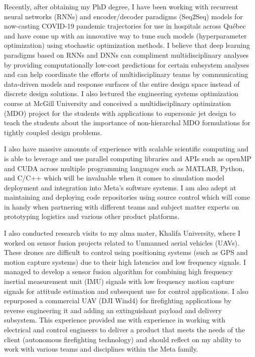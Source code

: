 \documentclass[12pt]{article} %
\begin{document}
\medskip %

Recently, after obtaining my PhD degree, I have been working with recurrent neural networks (RNNs) and encoder/decoder paradigms (Seq2Seq) models for now-casting COVID-19 pandemic trajectories for use in hospitals across Qu{\'e}bec and have come up with an innovative way to tune such models (hyperparameter optimization) using stochastic optimization methods. I believe that deep learning paradigms based on RNNs and DNNs can compliment multidisciplinary analyses by providing computationally low-cost predictions for certain subsystem analyses and can help coordinate the efforts of multidisciplinary teams by communicating data-driven models and response surfaces of the entire design space instead of discrete design solutions. I also lectured the engineering systems optimization course at McGill University and conceived a multidisciplinary optimization (MDO) project for the students with applications to supersonic jet design to teach the students about the importance of non-hierarchal MDO formulations for tightly coupled design problems.

\medskip %

I also have massive amounts of experience with scalable scientific computing and is able to leverage and use parallel computing libraries and APIs such as openMP and CUDA across multiple programming languages such as MATLAB, Python, and C/C++ which will be invaluable when it comes to simulation model deployment and integration into Meta's software systems. I am also adept at maintaining and deploying code repositories using source control which will come in handy when partnering with different teams and subject matter experts on prototyping logistics and various other product platforms.

\medskip %

I also conducted research visits to my alma mater, Khalifa University, where I worked on sensor fusion projects related to Unmanned aerial vehicles (UAVs). These drones are difficult to control using positioning systems (such as GPS and motion capture systems) due to their high latencies and low frequency signals. I managed to develop a sensor fusion algorithm for combining high frequency inertial measurement unit (IMU) signals with low frequency motion capture signals for attitude estimation and subsequent use for control applications. I also repurposed a commercial UAV (DJI Wind4) for firefighting applications by reverse engineering it and adding an extinguishant payload and delivery subsystem. This experience provided me with experience in working with electrical and control engineers to deliver a product that meets the needs of the client (autonomous firefighting technology) and should reflect on my ability to work with various teams and disciplines within the Meta family.
\end{document}
